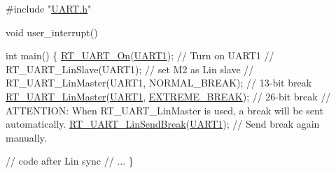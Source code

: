 \begin{DoxyCode}
\textcolor{preprocessor}{#include "\mbox{\hyperlink{a00173}{UART.h}}"}

\textcolor{keywordtype}{void} user\_interrupt()

int main() \{
    \mbox{\hyperlink{a00173_a7c1428a7b16eec7fe710679dd70b4069}{RT\_UART\_On}}(\mbox{\hyperlink{a00173_a8d69bf04d07af4fbbab5a8bd291f65ff}{UART1}});                          \textcolor{comment}{// Turn on UART1}
    \textcolor{comment}{// RT\_UART\_LinSlave(UART1);                 // set M2 as Lin slave}
    \textcolor{comment}{// RT\_UART\_LinMaster(UART1, NORMAL\_BREAK);  // 13-bit break}
    \mbox{\hyperlink{a00170_ab0faf051e642e540b1b9c114eae242bd}{RT\_UART\_LinMaster}}(\mbox{\hyperlink{a00173_a8d69bf04d07af4fbbab5a8bd291f65ff}{UART1}}, \mbox{\hyperlink{a00173_a7c76b3ed72795f2085873ee332fdab1b}{EXTREME\_BREAK}});    \textcolor{comment}{// 26-bit break}
    \textcolor{comment}{// ATTENTION: When RT\_UART\_LinMaster is used, a break will be sent automatically.}
    \mbox{\hyperlink{a00173_ad1e6c13693e5ea54a55ce78635617178}{RT\_UART\_LinSendBreak}}(\mbox{\hyperlink{a00173_a8d69bf04d07af4fbbab5a8bd291f65ff}{UART1}});                \textcolor{comment}{// Send break again manually.}

    \textcolor{comment}{// code after Lin sync}
    \textcolor{comment}{// ...}
\}
\end{DoxyCode}
 